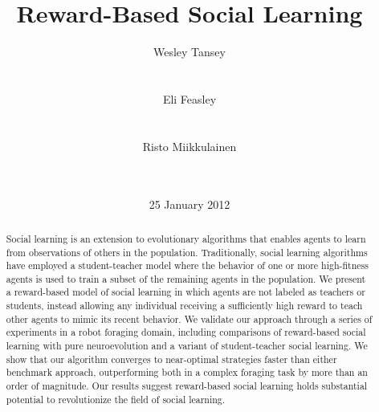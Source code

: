 \documentclass{acm_proc_article-sp}
\begin{document}
\title{Reward-Based Social Learning}

\author{
\alignauthor
Wesley Tansey\\
       \\
       \\
\alignauthor
Eli Feasley\\
       \\
       \\
\alignauthor
Risto Miikkulainen\\
       \\
       \\
}
\date{25 January 2012}

\maketitle
\begin{abstract}
Social learning is an extension to evolutionary algorithms that enables agents to learn from observations of others in the population. Traditionally, social learning algorithms have employed a student-teacher model where the behavior of one or more high-fitness agents is used to train a subset of the remaining agents in the population. We present a reward-based model of social learning in which agents are not labeled as teachers or students, instead allowing any individual receiving a sufficiently high reward to teach other agents to mimic its recent behavior. We validate our approach through a series of experiments in a robot foraging domain, including comparisons of reward-based social learning with pure neuroevolution and a variant of student-teacher social learning. We show that our algorithm converges to near-optimal strategies faster than either benchmark approach, outperforming both in a complex foraging task by more than an order of magnitude. Our results suggest reward-based social learning holds substantial potential to revolutionize the field of social learning.
\end{abstract}

\end{document}
